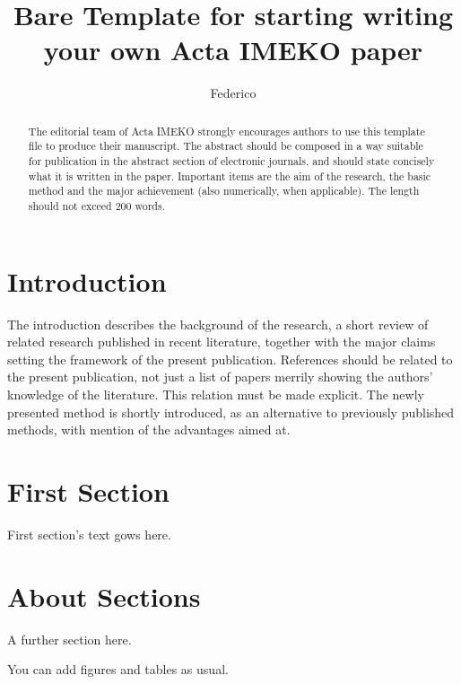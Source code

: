 \documentclass[onecolumn,notitlepage]{article}
\begin{document}
\title{Bare Template for starting writing your own Acta IMEKO paper} %

\author{Federico}

\begin{abstract}
    The editorial team of Acta IMEKO strongly encourages 
    authors to use this \LaTeXe template file to produce their manuscript. 
    The abstract should be composed in a way suitable for publication 
    in the abstract section of electronic journals, 
    and should state concisely what it is written in the paper. 
    Important items are the aim of the research, the basic method and the major achievement 
    (also numerically, when applicable). The length should not exceed 200 words.
    \end{abstract}
    
\maketitle %

\section{Introduction}

The introduction describes the background of the research, a 
short review of related research published in recent literature, 
together with the major claims setting the framework of the 
present publication. References should be related to the present 
publication, not just a list of papers merrily showing the authors'
knowledge of the literature. This relation must be made explicit. 
The newly presented method is shortly introduced, as an 
alternative to previously published methods, with mention of the 
advantages aimed at.


\section{First Section}

First section's text gows here.

\section{About Sections}

A further section here.

You can add figures and tables as usual.
\end{document}
